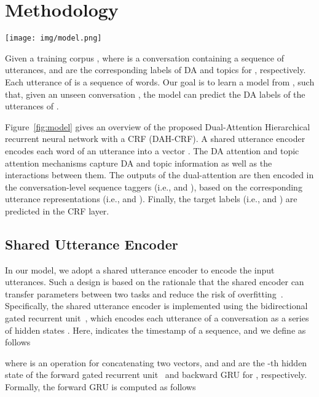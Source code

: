 \documentclass[11pt,a4paper]{article}
\begin{document}
\section{Methodology}




\begin{figure*}[t]
  \centering
  \texttt{[image: img/model.png]}
  \caption{Overview of the dual-attention hierarchical recurrent neural network with a CRF.}
  \label{fig:model}
\end{figure*}

Given a training corpus , where  is a conversation containing a sequence of  utterances,  and  are the corresponding labels of DA and topics for , respectively. Each utterance  of  is a sequence of  words. Our goal is to learn a model from , such that, given an unseen conversation , the model can predict the DA labels 
of the utterances of . 


Figure~\ref{fig:model} gives an overview of the proposed Dual-Attention Hierarchical recurrent neural network with a CRF (DAH-CRF). 
A shared utterance encoder encodes each word  of an utterance  into a vector .
The DA attention and topic attention mechanisms capture DA and topic information as well as the interactions between them. 
The outputs of the dual-attention are then encoded in the conversation-level sequence taggers (i.e.,  and ), based on the corresponding utterance representations (i.e.,  and ). Finally, the target labels (i.e.,  and ) are predicted in the CRF layer. 




\subsection{Shared Utterance Encoder}
In our model, we adopt a shared utterance encoder to encode the input utterances.  Such a design is based on the rationale that the shared encoder can transfer parameters between two tasks and reduce the risk of overfitting~\cite{ruder2017overview}. 
Specifically, the shared utterance encoder is implemented using the bidirectional gated recurrent unit~\cite[BiGRU]{cho2014properties}, which encodes each utterance  of a conversation  as a series of hidden states . Here,  indicates the timestamp of a sequence, and  we define  as follows 

where  is an operation for concatenating two vectors, and  and  are the -th hidden state of the forward gated recurrent unit~\cite[GRU]{cho2014properties} and backward GRU for , respectively. Formally, the forward GRU  is computed as follows 
\def\GRU{\mathop{\rm GRU}}
\end{document}
